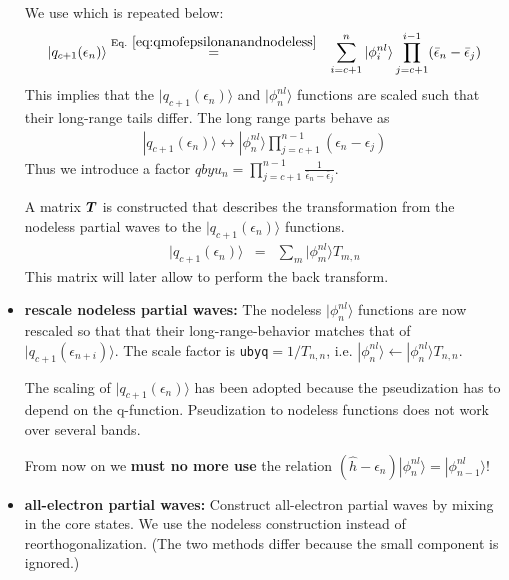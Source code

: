 \documentclass[11pt,a4paper]{report}
\begin{document}
\begin{itemize}
We use  which is repeated below:
\begin{eqnarray*}
|q_{c+1}(\epsilon_n)\rangle&\eqrel{eq:qmofepsilonanandnodeless}{=}&
\sum_{i=c+1}^n|\phi^{nl}_i\rangle
\prod_{j=c+1}^{i-1}(\bar{\epsilon}_n-\bar{\epsilon}_j)
\end{eqnarray*}
This implies that the $|q_{c+1}(\epsilon_{n})\rangle$ and $|\phi^{nl}_n\rangle$
functions are scaled such that their long-range tails differ.
The long range parts behave as
\begin{eqnarray*}
|q_{c+1}(\epsilon_{n})\rangle\leftrightarrow
|\phi^{nl}_{n}\rangle
\prod_{j=c+1}^{n-1}(\epsilon_{n}-\epsilon_j)
\end{eqnarray*}
Thus we introduce a factor
$qbyu_n=\prod_{j=c+1}^{n-1}\frac{1}{\bar{\epsilon}_{n}-\bar{\epsilon}_j}$.  


A matrix $\bm{T}$ is constructed that describes the transformation
from the nodeless partial waves to the $|q_{c+1}(\epsilon_n)\rangle$
functions.
\begin{eqnarray*}
|q_{c+1}(\epsilon_n)\rangle&=&\sum_m|\phi^{nl}_m\rangle T_{m,n}
\end{eqnarray*}
This matrix will later allow to perform the back transform.
%
\item \textbf{rescale nodeless partial waves:} The nodeless
  $|\phi^{nl}_n\rangle$ functions are now rescaled so that that their
  long-range-behavior matches that of
  $|q_{c+1}(\epsilon_{n+i})\rangle$. The scale factor is
  \verb|ubyq|$=1/T_{n,n}$,
  i.e. $|\phi^{nl}_n\rangle\leftarrow|\phi^{nl}_n\rangle T_{n,n}$.

  The scaling of $|q_{c+1}(\epsilon_n)\rangle$ has been adopted
  because the pseudization has to depend on the
  q-function. Pseudization to nodeless functions does not work over
  several bands.

  From now on we \textbf{must no more use} the relation
  $(\hat{h}-\epsilon_n)|\phi^{nl}_n\rangle=|\phi^{nl}_{n-1}\rangle$!

\item \textbf{all-electron partial waves:} Construct all-electron
  partial waves by mixing in the core states. We use the nodeless
  construction instead of reorthogonalization. (The two methods differ
  because the small component is ignored.)


\end{itemize}
\end{document}
